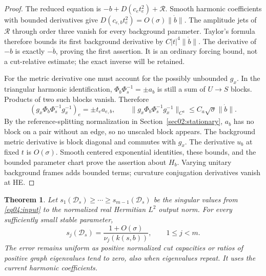 \documentclass[11pt]{amsart}
\newtheorem{theorem}{Theorem}[section]
\theoremstyle{definition}
\theoremstyle{remark}
\begin{document}
\begin{proof}
The reduced equation is \(-b+D(c_et_e^2)+\mathcal R\).
Smooth harmonic coefficients with bounded derivatives give
\(D(c_{e,b}t_e^2)=O(\sigma)\|\dot b\|\).
The amplitude jets of \(\mathcal R\) through order three vanish
for every background parameter. Taylor's formula therefore bounds
its first background derivative by \(C|t|^4\|\dot b\|\).
The derivative of \(-b\) is exactly \(-\dot b\), proving the
first assertion. It is an ordinary forcing bound, not a cut-relative
estimate; the exact inverse will be retained.

For the metric derivative one must account for the possibly
unbounded \(g_x\). In the triangular harmonic identification,
\(\Phi_b\Phi_s^{-1}=\pm a_b\) is still a sum of \(U\to S\)
blocks. Products of two such blocks vanish. Therefore
\begin{equation}\label{eq04:triangular}
 (g_x\Phi_b\Phi_s^{-1}g_x^{-1})_e=\pm t_ea_{e,b},\qquad
 \|g_x\Phi_b\Phi_s^{-1}g_x^{-1}\|_{C^a}
       \le C_a\sqrt\sigma\|\dot b\|.
\end{equation}
By the reference-splitting normalization in
Section~\ref{sec02:stationary}, \(a_b\) has no block on a pair
without an edge, so no unscaled block appears.
The background metric derivative is block
diagonal and commutes with \(g_x\). The derivative \(u_b\) at
fixed \(t\) is \(O(\sigma)\). Smooth centered exponential
identities, these bounds, and the bounded parameter chart prove
the assertion about \(H_b\). Varying unitary background frames
adds bounded terms; curvature conjugation derivatives vanish at HE.
\end{proof}

\begin{theorem}\label{thm04:response}
Let \(s_1(\mathscr D_s)\ge\cdots\ge s_{m-1}(\mathscr D_s)\)
be the singular values from \eqref{eq04:input} to the normalized
real Hermitian \(L^2\) output norm. For every sufficiently small
stable parameter,
\begin{equation}\label{eq04:singular}
 s_j(\mathscr D_s)=\frac{1+O(\sigma)}{\nu_j(k(s,b))},
 \qquad 1\le j<m.
\end{equation}
The error remains uniform as positive normalized cut capacities
or ratios of positive graph eigenvalues tend to zero, also when
eigenvalues repeat. It uses the current harmonic coefficients.
\end{theorem}
\end{document}
